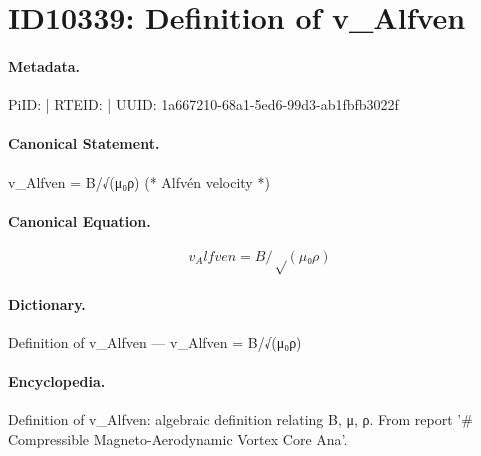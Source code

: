 \section*{ID10339: Definition of v\_Alfven}
\paragraph{Metadata.}
PiID:  | RTEID:  | UUID: 1a667210-68a1-5ed6-99d3-ab1fbfb3022f

\paragraph{Canonical Statement.}
v\_Alfven = B/√(μ₀ρ) (* Alfvén velocity *)

\paragraph{Canonical Equation.}
\[
v_Alfven = B/√(μ₀ρ)
\]

\paragraph{Dictionary.}
Definition of v\_Alfven — v\_Alfven = B/√(μ₀ρ)

\paragraph{Encyclopedia.}
Definition of v\_Alfven: algebraic definition relating B, μ, ρ. From report '\# Compressible Magneto-Aerodynamic Vortex Core Ana'.
